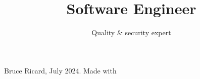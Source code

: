 \documentclass{curve}
\title{Software Engineer}
\subtitle{Quality \& security expert}
\begin{document}
\makeheaders[t]
\maketitle

\newpage
\makeheaders[t]


\vfill
\begin{center}
\tiny Bruce Ricard, July 2024. Made with \LaTeXe
\end{center}
\end{document}
